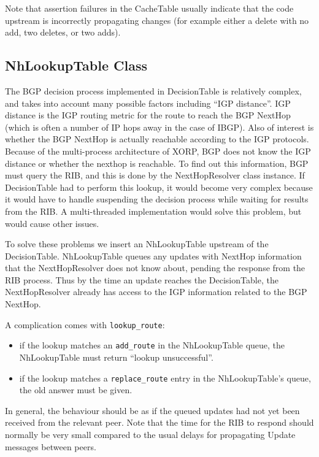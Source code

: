 \documentclass[11pt]{article}
\begin{document}
Note that assertion failures in the CacheTable usually indicate that
the code upstream is incorrectly propagating changes (for example
either a delete with no add, two deletes, or two adds).

\subsection{NhLookupTable Class}

The BGP decision process implemented in DecisionTable is relatively
complex, and takes into account many possible factors including ``IGP
distance''.  IGP distance is the IGP routing metric for the route to
reach the BGP NextHop (which is often a number of IP hops away in the
case of IBGP).  Also of interest is whether the BGP NextHop is
actually reachable according to the IGP protocols.  Because of the
multi-process architecture of XORP, BGP does not know the IGP distance
or whether the nexthop is reachable.  To find out this information,
BGP must query the RIB, and this is done by the NextHopResolver class
instance.  If DecisionTable had to perform this lookup, it would
become very complex because it would have to handle suspending the
decision process while waiting for results from the RIB.  A
multi-threaded implementation would solve this problem, but would
cause other issues.

To solve these problems we insert an NhLookupTable upstream of the
DecisionTable.  NhLookupTable queues any updates with NextHop
information that the NextHopResolver does not know about, pending the
response from the RIB process.  Thus by the time an update reaches the
DecisionTable, the NextHopResolver already has access to the IGP
information related to the BGP NextHop.

A complication comes with {\tt lookup\_route}:

\begin{itemize}

  \item if the lookup matches an {\tt add\_route} in the NhLookupTable queue,
  the NhLookupTable must return ``lookup unsuccessful''.

  \item if the lookup matches a {\tt replace\_route} entry in the
  NhLookupTable's queue, the old answer must be given.

\end{itemize}

In general, the behaviour should be as if the queued updates had not
yet been received from the relevant peer.  Note that the time for the
RIB to respond should normally be very small compared to the usual
delays for propagating Update messages between peers.
\end{document}
